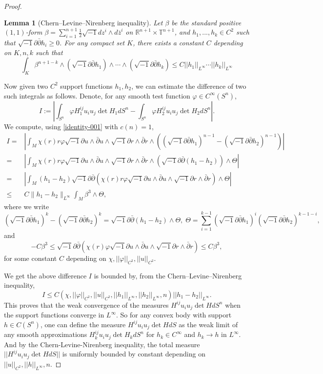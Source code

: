 \documentclass[reqno]{amsart}
\theoremstyle{remark}
\theoremstyle{plain}
\newtheorem{lemma}[thm]{Lemma}
\newcommand{\ddc}{\sqrt{-1}\partial\bar\partial}
\begin{document}
\begin{proof}
\begin{lemma}[Chern–Levine–Nirenberg inequality]
    Let $\beta$ be the standard positive $(1,1)$-form $\beta=\sum_{i=1}^{n+1}\frac{1}{2}\sqrt{-1}dz^i\wedge d\bar{z}^i$ on $\mathbb{R}^{n+1}\times \mathbb{T}^{n+1}$, and $h_1,..., h_k\in C^2$ such that $\ddc h_i\geq 0$. For any compact set $K$, there exists a constant $C$ depending on $K,n,k$ such that  \[
    \int_{K}\beta^{n+1-k}\wedge(\ddc h_1)\wedge\cdots \wedge(\ddc h_k)\leq C||h_1||_{L^\infty}\cdots ||h_k||_{L^\infty}
    \]
\end{lemma}
Now given two $C^2$ support functions $h_1, h_2$,  we can estimate the difference of two such integrals as follows.
Denote, for any smooth test function $\varphi\in C^\infty(S^n)$, 
\begin{equation}
    I:=\left|\int_{S^n}\varphi H_1^{ij}u_iu_j\det H_1dS^n-\int_{S^n}\varphi H_2^{ij}u_iu_j\det H_2dS^n\right|.
\end{equation}
We compute, using \eqref{identity-001} with $c(n)=1$, 
\[
\begin{split}
   I=&\left|\int_{M}\chi(r)r\varphi\sqrt{-1}\partial u\wedge\bar{\partial} u\wedge\sqrt{-1}\partial r\wedge\bar{\partial}r\wedge((\ddc h_1)^{n-1}-(\ddc h_2)^{n-1})\right|\\
   =&\left|\int_{M}\chi(r)r\varphi\sqrt{-1}\partial u\wedge\bar{\partial} u\wedge\sqrt{-1}\partial r\wedge\bar{\partial}r\wedge (\sqrt{-1}\partial\bar\partial(h_1-h_2))\wedge \Theta\right|\\
   =&\left|\int_M (h_1-h_2) \ddc(\chi(r)r\varphi\sqrt{-1}\partial u\wedge\bar{\partial} u\wedge\sqrt{-1}\partial r\wedge\bar{\partial}r)\wedge \Theta \right|\\
   \leq &C\|h_1-h_2\|_{L^\infty}\int_M\beta^3\wedge \Theta ,
\end{split}
\]where we write \[(\ddc h_1)^k-(\ddc h_2)^k=\ddc(h_1-h_2)\wedge \Theta, \; \Theta=\sum_{i=1}^{k-1}(\ddc h_1)^{i}(\ddc h_2)^{k-1-i},\]
and \[
-C\beta^3\leq \ddc(\chi(r)\varphi\sqrt{-1}\partial u\wedge\bar{\partial} u\wedge\sqrt{-1}\partial r\wedge\bar{\partial}r)\leq C\beta^3,
\]for some constant $C$ depending on $\chi, ||\varphi||_{C^2},||u||_{C^2}.$

We get the above difference $I$ is bounded by, from the Chern–Levine–Nirenberg inequality, \[
I\leq C(\chi,||\varphi||_{C^2}, ||u||_{C^2}, ||h_1||_{L^\infty},||h_2||_{L^\infty},n)||h_1-h_2||_{L^\infty}.
\]
This proves that the weak convergence of the measures $H^{ij}u_iu_j\det HdS^n$ when the support functions converge in $L^\infty$. So for any convex body with support $h\in C(S^n)$, one can define the measure $H^{ij}u_iu_j\det HdS$ as the weak limit of any smooth approximations $H_k^{ij}u_iu_j\det H_kdS^n$ for $h_k\in C^\infty$ and $h_k\rightarrow h$ in $L^\infty$. And by the Chern-Levine-Nirenberg inequality, the total measure $||H^{ij}u_iu_j\det HdS||$ is uniformly bounded by constant depending on $||u||_{C^2},||h||_{L^\infty},n.$ 
\end{proof}
\end{document}
